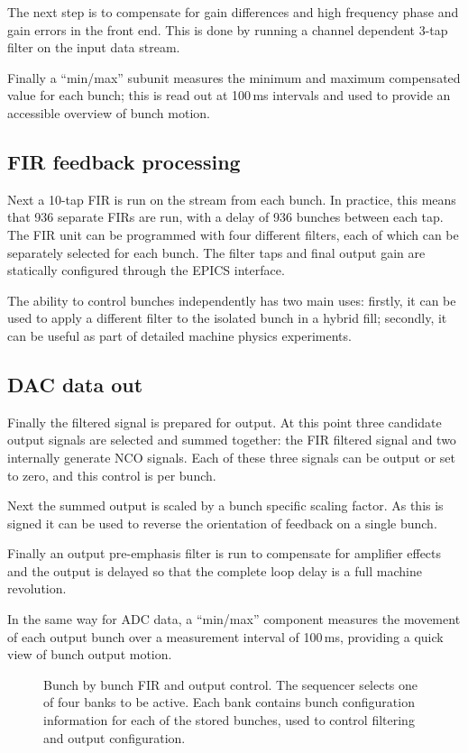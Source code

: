 \documentclass{jacow}
\begin{document}
The next step is to compensate for gain differences and high frequency phase and
gain errors in the front end.  This is done by running a channel dependent 3-tap
filter on the input data stream.

Finally a ``min/max'' subunit measures the minimum and maximum compensated value
for each bunch; this is read out at 100\,ms intervals and used to provide an
accessible overview of bunch motion.


\subsection{FIR feedback processing}

Next a 10-tap FIR is run on the stream from each bunch.  In practice, this means
that 936 separate FIRs are run, with a delay of 936 bunches between each tap.
The FIR unit can be programmed with four different filters, each of which can be
separately selected for each bunch.  The filter taps and final output gain are
statically configured through the EPICS interface.

The ability to control bunches independently has two main uses: firstly, it can
be used to apply a different filter to the isolated bunch in a hybrid fill;
secondly, it can be useful as part of detailed machine physics experiments.


\subsection{DAC data out}

Finally the filtered signal is prepared for output.  At this point three
candidate output signals are selected and summed together: the FIR filtered
signal and two internally generate NCO signals.  Each of these three signals can
be output or set to zero, and this control is per bunch.

Next the summed output is scaled by a bunch specific scaling factor.  As this is
signed it can be used to reverse the orientation of feedback on a single bunch.

Finally an output pre-emphasis filter is run to compensate for amplifier effects
and the output is delayed so that the complete loop delay is a full machine
revolution.

In the same way for ADC data, a ``min/max'' component measures the movement of
each output bunch over a measurement interval of 100\,ms, providing a quick view
of bunch output motion.


\begin{figure}[t]
\begin{centering}

\end{centering}
\caption{
Bunch by bunch FIR and output control.  The sequencer selects one of four banks
to be active.  Each bank contains bunch configuration information for each of
the stored bunches, used to control filtering and output configuration.
}
\label{bunch}
\end{figure}
\end{document}
